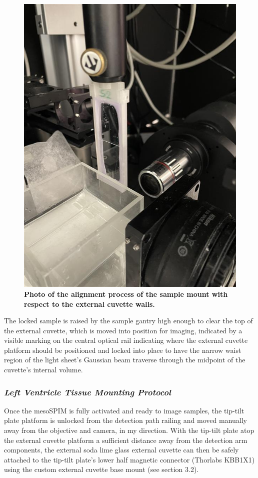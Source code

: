 \begin{figure}[H]
    \centering
    \includegraphics[width=0.5\linewidth]{Images/Alignment_Photo.jpg}
    \caption{\textbf{Photo of the alignment process of the sample mount with respect to the external cuvette walls.} }
    \label{fig:enter-label}
\end{figure}

The locked sample is raised by the sample gantry high enough to clear the top of the external cuvette, which is moved into position for imaging, indicated by a visible marking on the central optical rail indicating where the external cuvette platform should be positioned and locked into place to have the narrow waist region of the light sheet's Gaussian beam traverse through the midpoint of the cuvette's internal volume.


\subsubsection{\textit{Left Ventricle Tissue Mounting Protocol}}
Once the mesoSPIM is fully activated and ready to image samples, the tip-tilt plate platform is unlocked from the detection path railing and moved manually away from the objective and camera, in my direction.  With the tip-tilt plate atop the external cuvette platform a sufficient distance away from the detection arm components, the external soda lime glass external cuvette can then be safely attached to the tip-tilt plate’s lower half magnetic connector (Thorlabs KBB1X1) using the custom external cuvette base mount (see section 3.2). 

